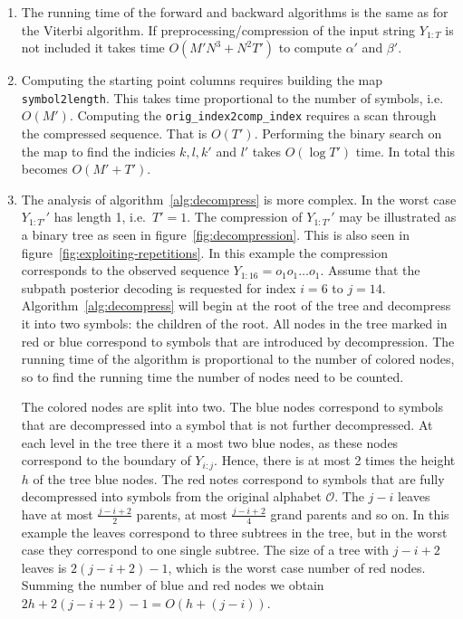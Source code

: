\begin{enumerate}
\item The running time of the forward and backward algorithms is the same as
  for the Viterbi algorithm. If preprocessing/compression of the input string
  $Y_{1:T}$ is not included it takes time $O(M' N^3 + N^2 T')$ to compute
  $\alpha'$ and $\beta'$.

\item Computing the starting point columns requires building the map
  \texttt{symbol2length}. This takes time proportional to the number of
  symbols, i.e.\ $O(M')$. Computing the \texttt{orig\_index2comp\_index}
  requires a scan through the compressed sequence. That is $O(T')$. Performing
  the binary search on the map to find the indicies $k, l, k'$ and $l'$ takes
  $O(\log T')$ time. In total this becomes $O(M' + T')$.

\item The analysis of algorithm~\ref{alg:decompress} is more complex. In the
  worst case $Y_{1:T'}'$ has length 1, i.e.\ $T' = 1$. The compression of
  $Y_{1:T'}'$ may be illustrated as a binary tree as seen in
  figure~\ref{fig:decompression}. This is also seen in
  figure~\ref{fig:exploiting-repetitions}. In this example the compression
  corresponds to the observed sequence $Y_{1:16} = o_1o_1\dots{}o_1$. Assume
  that the subpath posterior decoding is requested for index $i = 6$ to $j =
  14$. Algorithm~\ref{alg:decompress} will begin at the root of the tree and
  decompress it into two symbols: the children of the root. All nodes in the tree
  marked in red or blue correspond to symbols that are introduced by
  decompression. The running time of the algorithm is proportional to the
  number of colored nodes, so to find the running time the number of nodes need
  to be counted.

  The colored nodes are split into two. The blue nodes correspond to symbols
  that are decompressed into a symbol that is not further decompressed. At each
  level in the tree there it a most two blue nodes, as these nodes correspond
  to the boundary of $Y_{i:j}$. Hence, there is at most 2 times the height $h$
  of the tree blue nodes. The red notes correspond to symbols that are fully
  decompressed into symbols from the original alphabet $\mathcal{O}$. The
  $j - i$ leaves have at most $\frac{j - i + 2}{2}$ parents, at most
  $\frac{j - i + 2}{4}$ grand parents and so on. In this example the leaves
  correspond to three subtrees in the tree, but in the worst case they
  correspond to one single subtree. The size of a tree with $j - i + 2$ leaves
  is $2(j - i + 2) - 1$, which is the worst case number of red nodes. Summing
  the number of blue and red nodes we obtain
  $2h + 2(j - i + 2) - 1 = O(h + (j - i))$.


\end{enumerate}

